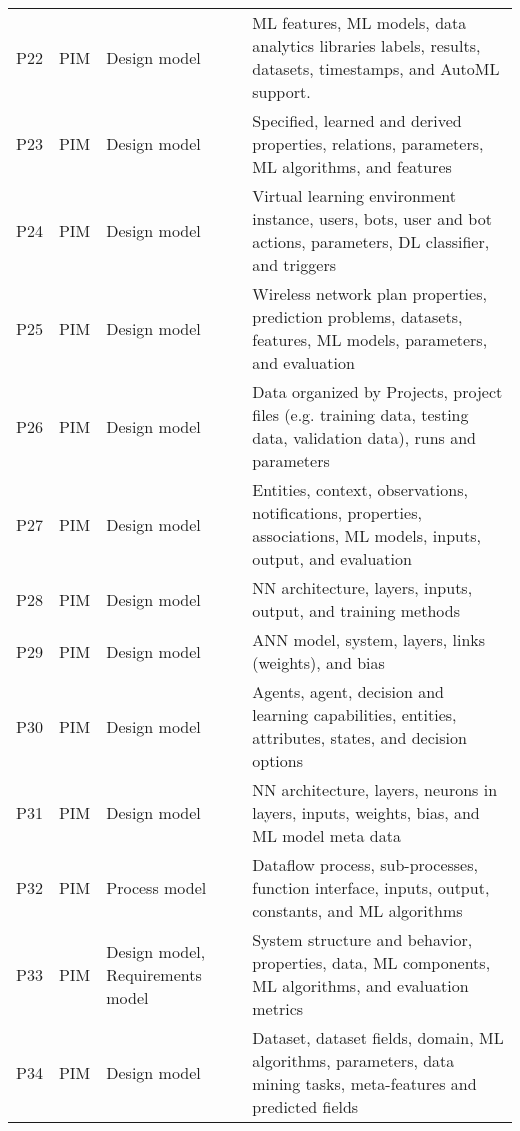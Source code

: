 \begin{table}[htbp]
{\begin{tabular}{l l l l }
            \TBstrut P22 \TBstrut	& PIM    & Design model  & ML features, ML models, data analytics libraries labels, results, datasets, timestamps, and AutoML support. \TBstrut \\
            \TBstrut P23 \TBstrut	& PIM    & Design model  & Specified, learned and derived properties, relations, parameters, ML algorithms, and features\TBstrut \\
            \TBstrut P24 \TBstrut	& PIM    & Design model  & Virtual learning environment instance, users, bots, user and bot actions, parameters, DL classifier, and triggers \TBstrut \\
            \TBstrut P25 \TBstrut	& PIM    & Design model  &  Wireless network plan properties, prediction problems, datasets, features, ML models, parameters, and evaluation \TBstrut \\
            \TBstrut P26 \TBstrut	& PIM    & Design model  & Data organized by Projects, project files (e.g. training data, testing data, validation data), runs and parameters\TBstrut \\
            \TBstrut P27 \TBstrut	& PIM    & Design model  & Entities, context, observations, notifications, properties, associations, ML models, inputs, output, and evaluation\TBstrut \\
            \TBstrut P28 \TBstrut	& PIM    & Design model  & NN architecture, layers, inputs, output, and training methods\TBstrut \\
            \TBstrut P29 \TBstrut	& PIM    & Design model  & ANN model, system, layers, links (weights), and bias\TBstrut \\
            \TBstrut P30 \TBstrut	& PIM    & Design model  & Agents, agent, decision and learning capabilities, entities, attributes, states, and decision options\TBstrut \\
            \TBstrut P31 \TBstrut	& PIM    & Design model  & NN architecture, layers, neurons in layers, inputs, weights, bias, and ML model meta data\TBstrut \\
            \TBstrut P32 \TBstrut	& PIM    & Process model & Dataflow process, sub-processes, function interface, inputs, output, constants, and ML algorithms\TBstrut \\
            \TBstrut P33 \TBstrut	& PIM    & Design model, Requirements model & System structure and behavior, properties, data, ML components, ML algorithms, and evaluation metrics \TBstrut \\
            \TBstrut P34 \TBstrut	& PIM    & Design model  & Dataset, dataset fields, domain, ML algorithms, parameters, data mining tasks, meta-features and predicted fields\TBstrut \\

\end{tabular}}
\end{table}
